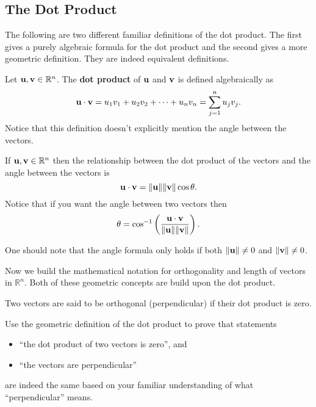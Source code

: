 \subsection{The Dot Product}
The following are two different familiar definitions of the dot product.  The first gives
a purely algebraic formula for the dot product and the second gives a more geometric
definition.  They are indeed equivalent definitions.
\begin{definition}
    Let ${\bf u}, {\bf v} \in \mathbb{R}^n$.  The {\bf dot product} of ${\bf u}$ and ${\bf v}$ is defined
    algebraically as
    \[ {\bf u} \cdot {\bf v} = u_1 v_1 + u_2 v_2 + \cdots + u_n v_n = \sum_{j=1}^n u_j v_j. \]
    Notice that this definition doesn't explicitly mention the angle between the vectors.
\end{definition}

\begin{definition}
    If ${\bf u},{\bf v}\in\mathbb{R}^n$ then the relationship between the dot product of the
    vectors and the angle between the vectors is
    \[ {\bf u} \cdot {\bf v} = \|{\bf u}\| \|{\bf v}\| \cos \theta. \]
    Notice that if you want the angle between two vectors then 
    \[ \theta = \cos^{-1} \left( \frac{{\bf u} \cdot {\bf v}}{\| {\bf u} \| \|{\bf v}\|} \right). \]
\end{definition}
One should note that the angle formula only holds if both $\|{\bf u}\|\ne0$ and $\|{\bf v}\|\ne0$.

Now we build the mathematical notation for orthogonality and length of vectors in
$\mathbb{R}^n$.  Both of these geometric concepts are build upon the dot product.
\begin{definition}
    Two vectors are said to be orthogonal (perpendicular) if their dot product is zero.
\end{definition}
\begin{problem}
    Use the geometric definition of the dot product to prove that statements 
    \begin{itemize}
        \item ``the dot product of two vectors is zero'', and 
        \item ``the vectors are perpendicular'' 
    \end{itemize}
    are indeed the same based on your familiar understanding of what ``perpendicular''
    means.
\end{problem}

